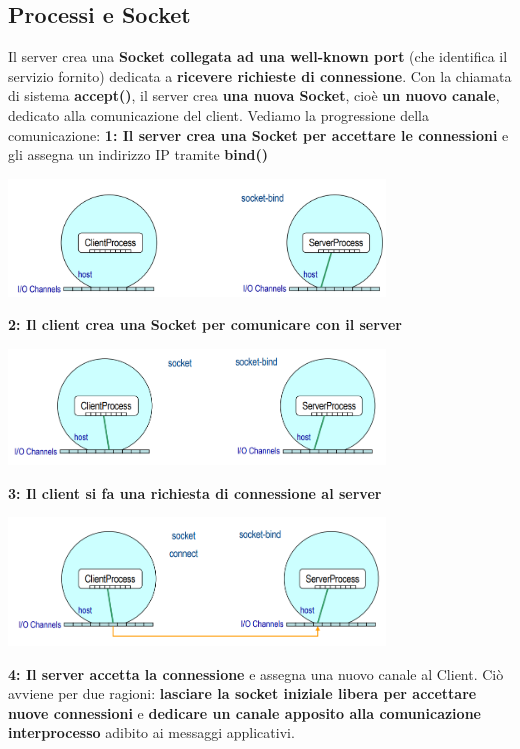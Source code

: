 \documentclass[12pt]{article}
\begin{document}
\subsection{Processi e Socket}
Il server crea una \textbf{Socket collegata ad una well-known port} (che identifica il servizio fornito) dedicata a \textbf{ricevere richieste di connessione}. Con la chiamata di sistema \textbf{accept()}, il server crea \textbf{una nuova Socket}, cioè \textbf{un nuovo canale}, dedicato alla comunicazione del client. \newline
Vediamo la progressione della comunicazione:
\newline
\textbf{1: Il server crea una Socket per accettare le connessioni} e gli assegna un indirizzo IP tramite \textbf{bind()}
\begin{center}
    \includegraphics[width = 0.75\textwidth]{Images/26.png}
\end{center}
\textbf{2: Il client crea una Socket per comunicare con il server}
\begin{center}
    \includegraphics[width = 0.75\textwidth]{Images/27.PNG}
\end{center}
\textbf{3: Il client si fa una richiesta di connessione al server}
\begin{center}
    \includegraphics[width = 0.75\textwidth]{Images/28.PNG}
\end{center}
\textbf{4: Il server accetta la connessione} e assegna una nuovo canale al Client. Ciò avviene per due ragioni: \textbf{lasciare la socket iniziale libera per accettare nuove connessioni} e \textbf{dedicare un canale apposito alla comunicazione interprocesso} adibito ai messaggi applicativi.
\end{document}
